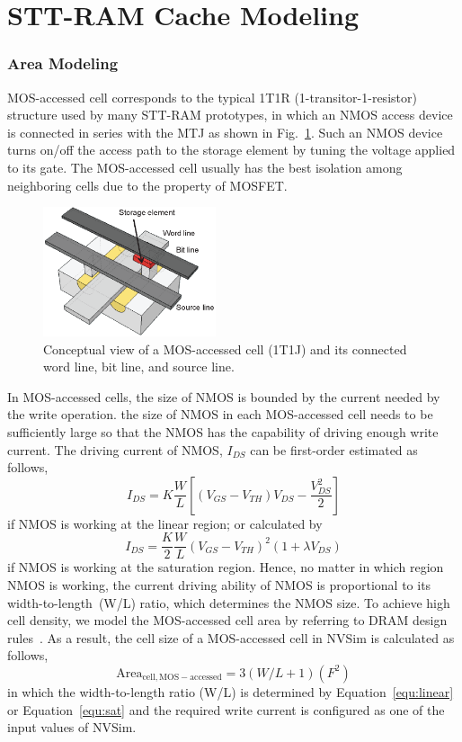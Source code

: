 \section{STT-RAM Cache Modeling} \label{sec:model}


\subsubsection{Area Modeling}

MOS-accessed cell corresponds to the typical 1T1R (1-transitor-1-resistor) structure used by many STT-RAM prototypes, in which an NMOS access device is connected in series with the MTJ as shown in Fig.~\ref{fig:1t1r}.  Such an NMOS device turns on/off the access path to the storage element by tuning the voltage applied to its gate.  The MOS-accessed cell usually has the best isolation among neighboring cells due to the property of MOSFET.

\begin{figure}[t]
  \centering
  \includegraphics[width=2.0in]{fig/1t1r.eps}
  \caption{Conceptual view of a MOS-accessed cell (1T1J) and its connected word line, bit line, and source line.}
  \label{fig:1t1r}
\end{figure}

In MOS-accessed cells, the size of NMOS is bounded by the current needed by the write operation.  the size of NMOS in each MOS-accessed cell needs to be sufficiently large so that the NMOS has the capability of driving enough write current. The driving current of NMOS, $I_{DS}$ can be first-order estimated as follows,
\begin{equation}
I_{DS}=K\frac{W}{L}\left[\left(V_{GS}-V_{TH}\right)V_{DS}-\frac{V_{DS}^2}{2}\right]  \label{equ:linear}
\end{equation}
if NMOS is working at the linear region; or calculated by
\begin{equation}
I_{DS}=\frac{K}{2}\frac{W}{L}\left(V_{GS}-V_{TH}\right)^2\left(1+\lambda  \label{equ:sat}
V_{DS}\right)
\end{equation}
if NMOS is working at the saturation region.  Hence, no matter in which region NMOS is working, the current driving ability of NMOS is proportional to its width-to-length~(W/L) ratio, which determines the NMOS size.  To achieve high cell density, we model the MOS-accessed cell area by referring to DRAM design rules~\cite{DRAM:6F2}.  As a result, the cell size of a MOS-accessed cell in NVSim is calculated as follows,
\begin{equation}
\mathrm{Area}_{\mathrm{cell,MOS-accessed}}={3\left(W/L+1\right)}(F^2)
\end{equation}
in which the width-to-length ratio (W/L) is determined by Equation~\ref{equ:linear} or Equation~\ref{equ:sat} and the required write current is configured as one of the input values of NVSim. 